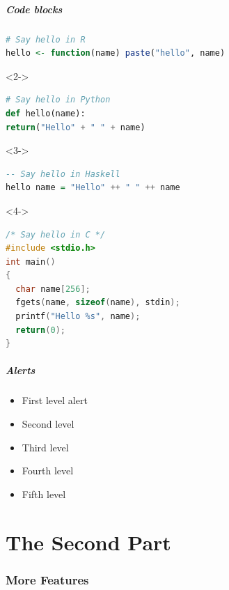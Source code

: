 \documentclass[11pt]{beamer}
\begin{document}
\begin{frame}[fragile]
  \frametitle{Code blocks}

\begin{lstlisting}[language=R]
# Say hello in R
hello <- function(name) paste("hello", name)
\end{lstlisting}

\begin{uncoverenv}<2->
\begin{lstlisting}[language=Python]
# Say hello in Python
def hello(name):
return("Hello" + " " + name)
\end{lstlisting}
\end{uncoverenv}

\begin{uncoverenv}<3->
\begin{lstlisting}[language=Haskell]
-- Say hello in Haskell
hello name = "Hello" ++ " " ++ name
\end{lstlisting}
\end{uncoverenv}


\begin{uncoverenv}<4->
\begin{lstlisting}[language=C]
/* Say hello in C */
#include <stdio.h>
int main()
{
  char name[256];
  fgets(name, sizeof(name), stdin);
  printf("Hello %s", name);
  return(0);
}
\end{lstlisting}
\end{uncoverenv}

\end{frame}

\begin{frame}
  \frametitle{Alerts}
  \begin{itemize}
     \item First level \alert{alert}
     \item Second level 
     \item Third level 
     \item Fourth level 
     \item Fifth level 
  \end{itemize}

\end{frame}
  
\part{The Second Part}

\section{More Features}
\end{document}
